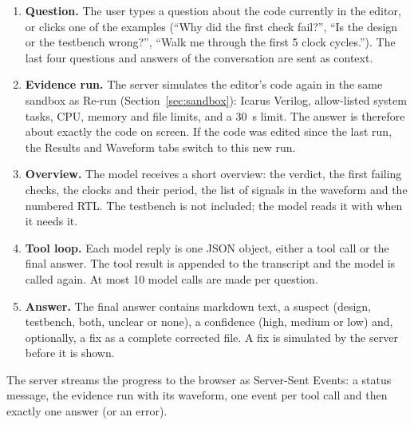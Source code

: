 \begin{enumerate}
\item \textbf{Question.} The user types a question about the code currently in the
editor, or clicks one of the examples (``Why did the first check fail?'', ``Is the
design or the testbench wrong?'', ``Walk me through the first 5 clock cycles.'').
The last four questions and answers of the conversation are sent as context.
\item \textbf{Evidence run.} The server simulates the editor's code again in the
same sandbox as Re-run (Section~\ref{sec:sandbox}): Icarus Verilog, allow-listed
system tasks, CPU, memory and file limits, and a 30~s limit. The answer is therefore
about exactly the code on screen. If the code was edited since the last run, the
Results and Waveform tabs switch to this new run.
\item \textbf{Overview.} The model receives a short overview: the verdict, the first
failing checks, the clocks and their period, the list of signals in the waveform and
the numbered RTL. The testbench is not included; the model reads it with
 when it needs it.
\item \textbf{Tool loop.} Each model reply is one JSON object, either a tool call or
the final answer. The tool result is appended to the transcript and the model is
called again. At most 10 model calls are made per question.
\item \textbf{Answer.} The final answer contains markdown text, a suspect (design,
testbench, both, unclear or none), a confidence (high, medium or low) and, optionally,
a fix as a complete corrected file. A fix is simulated by the server before it is
shown.
\end{enumerate}

The server streams the progress to the browser as Server-Sent Events: a status
message, the evidence run with its waveform, one event per tool call and then exactly
one answer (or an error).


